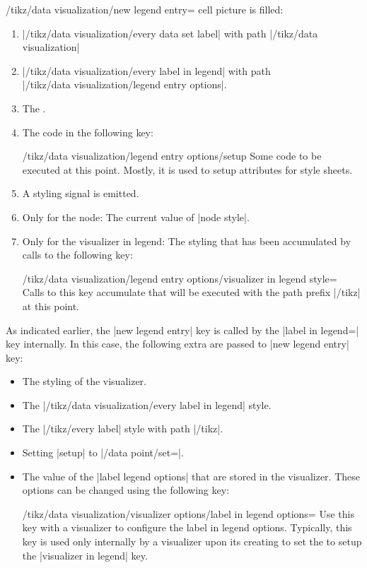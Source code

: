 \begin{key}{/tikz/data visualization/new legend entry=}
  cell picture is filled:
  \begin{enumerate}
  \item |/tikz/data visualization/every data set label| with path
    |/tikz/data visualization|
  \item |/tikz/data visualization/every label in legend| with path\\
    |/tikz/data visualization/legend entry options|.
  \item The .
  \item The code in the following key:
    \begin{key}{/tikz/data visualization/legend entry options/setup}
      Some code to be executed at this point. Mostly, it is used to
      setup attributes for style sheets.
    \end{key}
  \item A styling signal is emitted.
  \item Only for the node: The current value of |node style|.
  \item Only for the visualizer in legend: The styling that has been
    accumulated by calls to the following key:
    \begin{stylekey}{/tikz/data visualization/legend entry
        options/visualizer in legend style=\\}
      Calls to this key accumulate  that will be
      executed with the path prefix |/tikz| at this point.
    \end{stylekey}
  \end{enumerate}
\end{key}

As indicated earlier, the |new legend entry| key is called by the
|label in legend=| key internally. In this case, the
following extra  are passed to |new legend entry|
key:
\begin{itemize}
\item The styling of the visualizer.
\item The |/tikz/data visualization/every label in legend| style.
\item The |/tikz/every label| style with path |/tikz|.
\item Setting |setup| to |/data point/set=|.
\item The value of the |label legend options| that are stored in the
  visualizer. These options can be changed using the following key:
  \begin{key}{/tikz/data visualization/visualizer options/label in
      legend options=}
    Use this key with a visualizer to configure the label in legend
    options. Typically, this key is used only internally by a
    visualizer upon its creating to set the  to setup
    the |visualizer in legend| key.
  \end{key}
\end{itemize}


